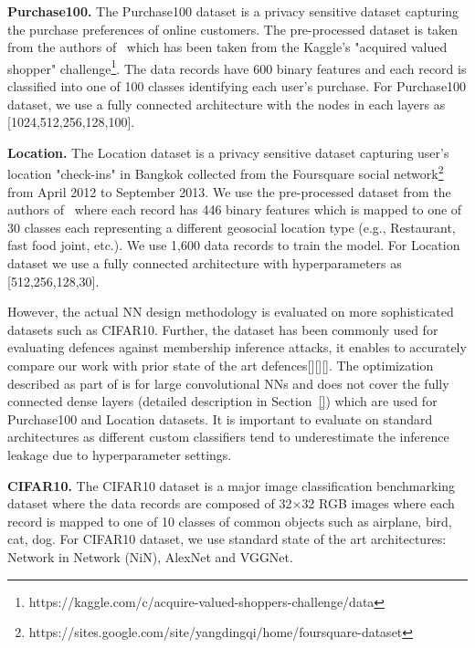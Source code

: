 \noindent\textbf{Purchase100.} The  Purchase100  dataset  is a privacy sensitive dataset capturing the purchase preferences of online customers.
The pre-processed dataset is taken from the authors of~\cite{} which has been taken from the Kaggle's "acquired valued shopper" challenge\footnote{https://kaggle.com/c/acquire-valued-shoppers-challenge/data}.
The data records have 600 binary features and each record is classified into one of 100 classes identifying each user's purchase.
For Purchase100 dataset, we use a fully connected architecture with the nodes in each layers as [1024,512,256,128,100].

\noindent\textbf{Location.} The Location dataset is a privacy sensitive dataset capturing user's location "check-ins" in Bangkok collected from the Foursquare social network\footnote{https://sites.google.com/site/yangdingqi/home/foursquare-dataset} from April 2012 to September 2013.
We use the pre-processed dataset from the authors of~\cite{} where each record has 446 binary features which is mapped to one of 30 classes each representing a different geosocial location type (e.g., Restaurant, fast food joint, etc.). We use 1,600 data records to train the model.
For Location dataset we use a fully connected architecture with hyperparameters as [512,256,128,30].

However, the actual \method\hspace{0.02in} NN design methodology is evaluated on more sophisticated datasets such as CIFAR10.
Further, the dataset has been commonly used for evaluating defences against membership inference attacks, it enables to accurately compare our work with prior state of the art defences[][][].
The optimization described as part of \method\hspace{0.02in} is for large convolutional NNs and does not cover the fully connected dense layers (detailed description in Section~\ref{}) which are used for Purchase100 and Location datasets.
It is important to evaluate on standard architectures as different custom classifiers tend to underestimate the inference leakage due to hyperparameter settings.

\noindent\textbf{CIFAR10.} The CIFAR10 dataset is a major image classification benchmarking dataset where the data records are composed of 32$\times$32 RGB images where each record is mapped to one of 10 classes of common objects such as airplane, bird, cat, dog.
For CIFAR10 dataset, we use standard state of the art architectures: Network in Network (NiN), AlexNet and VGGNet.

